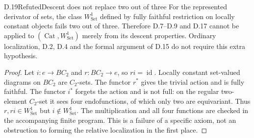 \begin{result}{D.19}{Refuted}{Descent does not replace two out of three}
For the represented derivator of sets, the class $W^1_{\mathrm{Set}}$
defined by fully faithful restriction on locally constant objects
fails two out of three. Therefore D.7--D.9 and D.17 cannot be
applied to $(\operatorname{Cat},W^1_{\mathrm{Set}})$ merely from
its descent properties. Ordinary localization, D.2, D.4 and the
formal argument of D.15 do not require this extra hypothesis.
\end{result}
\begin{proof}
Let $i:e\to BC_2$ and $r:BC_2\to e$, so $ri=\operatorname{id}$.
Locally constant set-valued diagrams on $BC_2$ are $C_2$-sets.
The functor $r^*$ gives the trivial action and is fully faithful.
The functor $i^*$ forgets the action and is not full: on the regular
two-element $C_2$-set it sees four endofunctions, of which only two
are equivariant. Thus $r,ri\in W^1_{\mathrm{Set}}$ but
$i\notin W^1_{\mathrm{Set}}$. The multiplication and all four
functions are checked in the accompanying finite program.
This is a failure of a specific axiom, not an obstruction to forming
the relative localization in the first place.
\end{proof}

